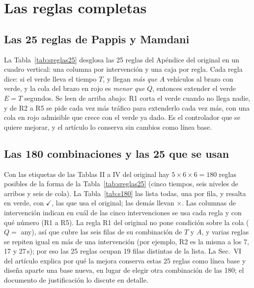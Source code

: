 \documentclass[journal]{IEEEtran}
\begin{document}
\FloatBarrier
\section{Las reglas completas}
\label{sec:s-reglas}
\FloatBarrier
\subsection{Las 25 reglas de Pappis y Mamdani}
La Tabla~\ref{tab:sreglas25} desglosa las 25 reglas del Apéndice del original en un cuadro vertical: una columna por intervención y una caja por regla. Cada regla dice: si el verde lleva el tiempo $T$, y llegan \emph{más que} $A$ vehículos al brazo con verde, y la cola del brazo en rojo es \emph{menor que} $Q$, entonces extender el verde $E=T$ segundos. Se leen de arriba abajo: R1 corta el verde cuando no llega nadie, y de R2 a R5 se pide cada vez más tráfico para extenderlo cada vez más, con una cola en rojo admisible que crece con el verde ya dado. Es el controlador que se quiere mejorar, y el artículo lo conserva sin cambios como línea base.



\FloatBarrier
\subsection{Las 180 combinaciones y las 25 que se usan}
Con las etiquetas de las Tablas II a IV del original hay $5\times6\times6=180$ reglas posibles de la forma de la Tabla~\ref{tab:sreglas25} (cinco tiempos, seis niveles de arribos y seis de cola). La Tabla~\ref{tab:s180} las lista todas, una por fila, y resalta en verde, con $\checkmark$, las que usa el original; las demás llevan $\times$. Las columnas de intervención indican en cuál de las cinco intervenciones se usa cada regla y con qué número (R1 a R5). La regla R1 del original no pone condición sobre la cola ($Q=$ any), así que cubre las seis filas de su combinación de $T$ y $A$, y varias reglas se repiten igual en más de una intervención (por ejemplo, R2 es la misma a los 7, 17 y 27\,s); por eso las 25 reglas ocupan 19 filas distintas de la lista. La Sec.~VI del artículo explica por qué la mejora conserva estas 25 reglas como línea base y diseña aparte una base nueva, en lugar de elegir otra combinación de las 180; el documento de justificación lo discute en detalle.



\FloatBarrier
\end{document}
